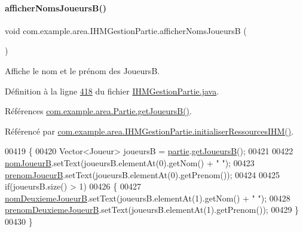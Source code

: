 \paragraph{\texorpdfstring{afficher\+Noms\+Joueurs\+B()}{afficherNomsJoueursB()}}
{\footnotesize\ttfamily void com.\+example.\+area.\+I\+H\+M\+Gestion\+Partie.\+afficher\+Noms\+JoueursB (\begin{DoxyParamCaption}{ }\end{DoxyParamCaption})\hspace{0.3cm}{\ttfamily [private]}}



Affiche le nom et le prénom des JoueursB. 



Définition à la ligne \hyperlink{_i_h_m_gestion_partie_8java_source_l00418}{418} du fichier \hyperlink{_i_h_m_gestion_partie_8java_source}{I\+H\+M\+Gestion\+Partie.\+java}.



Références \hyperlink{_partie_8java_source_l00072}{com.\+example.\+area.\+Partie.\+get\+Joueurs\+B()}.



Référencé par \hyperlink{_i_h_m_gestion_partie_8java_source_l00223}{com.\+example.\+area.\+I\+H\+M\+Gestion\+Partie.\+initialiser\+Ressources\+I\+H\+M()}.


\begin{DoxyCode}
00419     \{
00420         Vector<Joueur> joueursB = \hyperlink{classcom_1_1example_1_1area_1_1_i_h_m_gestion_partie_a225e150f813f8fa5c632709a57eacc32}{partie}.\hyperlink{classcom_1_1example_1_1area_1_1_partie_a3c6b981de54d03eeb553919983ee3be8}{getJoueursB}();
00421 
00422         \hyperlink{classcom_1_1example_1_1area_1_1_i_h_m_gestion_partie_a5aba0922e5b556ebc91d67793b149f52}{nomJoueurB}.setText(joueursB.elementAt(0).getNom() + \textcolor{stringliteral}{" "});
00423         \hyperlink{classcom_1_1example_1_1area_1_1_i_h_m_gestion_partie_aa25eb218f30b28bb0b750c9fa0c1a9af}{prenomJoueurB}.setText(joueursB.elementAt(0).getPrenom());
00424 
00425         \textcolor{keywordflow}{if}(joueursB.size() > 1)
00426         \{
00427             \hyperlink{classcom_1_1example_1_1area_1_1_i_h_m_gestion_partie_a68aa62c03f3280a8f22d84e1701c1c3e}{nomDeuxiemeJoueurB}.setText(joueursB.elementAt(1).getNom() + \textcolor{stringliteral}{" "});
00428             \hyperlink{classcom_1_1example_1_1area_1_1_i_h_m_gestion_partie_aa5e959a5694b49790434a7d1006f57f3}{prenomDeuxiemeJoueurB}.setText(joueursB.elementAt(1).getPrenom());
00429         \}
00430     \}
\end{DoxyCode}
\mbox{\label{classcom_1_1example_1_1area_1_1_i_h_m_gestion_partie_a42cce9ee62fd37d687d4a194328aac70}} 
